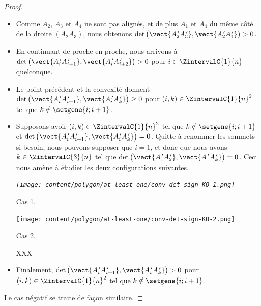 \begin{proof}
\begin{itemize}
		\item Comme $A_2$, $A_3$ et $A_4$ ne sont pas alignés, et de plus $A_1$ et $A_4$ du même côté de la droite $(A_2 A_3)$, nous obtenons
		$\det \big( \vect{A^{\,\prime}_2 A^{\,\prime}_3}, \vect{A^{\,\prime}_2 A^{\,\prime}_4} \big) > 0$.


		\item En continuant de proche en proche, nous arrivons à
		$\det \big( \vect{A^{\,\prime}_i A^{\,\prime}_{i+1}}, \vect{A^{\,\prime}_i A^{\,\prime}_{i+2}} \big) > 0$
		pour $i \in \ZintervalC{1}{n}$ quelconque.


		\item Le point précédent et la convexité donnent
		$\det \big( \vect{A^{\,\prime}_i A^{\,\prime}_{i+1}}, \vect{A^{\,\prime}_i A^{\,\prime}_k} \big) \geq 0$
		pour $(i, k) \in \ZintervalC{1}{n}^2$ tel que $k \notin \setgene{i ; i+1}$.


		\item Supposons avoir $(i, k) \in \ZintervalC{1}{n}^2$ tel que
		$k \notin \setgene{i ; i+1}$
		et
		$\det \big( \vect{A^{\,\prime}_i A^{\,\prime}_{i+1}}, \vect{A^{\,\prime}_i A^{\,\prime}_k} \big) = 0$.
		Quitte à renommer les sommets si besoin, nous pouvons supposer que $i = 1$, et donc que nous avons $k \in \ZintervalC{3}{n}$ tel que
		$\det \big( \vect{A^{\,\prime}_1 A^{\,\prime}_2}, \vect{A^{\,\prime}_1 A^{\,\prime}_k} \big) = 0$.
        Ceci nous amène à étudier les deux configurations suivantes. 
    
        \begin{multicols}{2}
        	\small\itshape\centering
        	\texttt{[image: content/polygon/at-least-one/conv-det-sign-KO-1.png]}
    	    
    	    \smallskip
    	    Cas 1.
        
        	\texttt{[image: content/polygon/at-least-one/conv-det-sign-KO-2.png]}
    	    
    	    \smallskip
    	    Cas 2.
        \end{multicols}
        
        \noindent 
        XXX








		\item Finalement,
		$\det \big( \vect{A^{\,\prime}_i A^{\,\prime}_{i+1}}, \vect{A^{\,\prime}_i A^{\,\prime}_k} \big) > 0$
		pour $(i, k) \in \ZintervalC{1}{n}^2$ tel que $k \notin \setgene{i ; i+1}$.
    \end{itemize}

    \smallskip
    
    Le cas négatif se traite de façon similaire. 
\end{proof}


